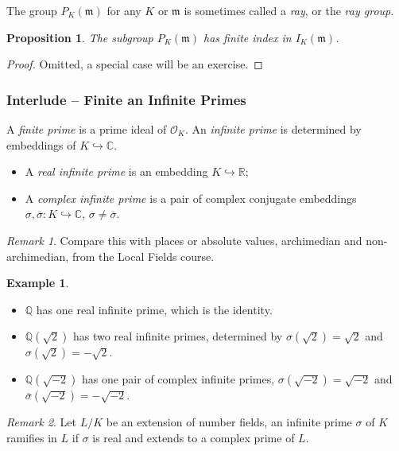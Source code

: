 \documentclass[11pt]{article}
\theoremstyle{definition}
\newtheorem*{example*}{Example}
\theoremstyle{plain}
\newtheorem{proposition}[definition]{Proposition}
\theoremstyle{remark}
\newtheorem*{remark*}{Remark}
\newcommand{\QQ}{\mathbb{Q}}
\newcommand{\RR}{\mathbb{R}}
\newcommand{\CC}{\mathbb{C}}
\newcommand{\cO}{\mathcal{O}}
\newcommand{\fm}{\mathfrak{m}}
\begin{document}
The group $P_K(\fm)$ for any $K$ or $\fm$ is sometimes called a \emph{ray}, or the \emph{ray group}.

\begin{proposition}\label{prop:2_16}
    The subgroup $P_K(\fm)$ has finite index in $I_K(\fm)$.
\end{proposition}
\begin{proof}
    Omitted, a special case will be an exercise.
\end{proof}

\subsubsection*{Interlude -- Finite an Infinite Primes}
A \emph{finite prime} is a prime ideal of $\cO_K$. An \emph{infinite prime} is determined by embeddings of $K \hookrightarrow \CC$.
\begin{itemize}
    \item A \emph{real infinite prime} is an embedding $K \hookrightarrow \RR$;
    \item A \emph{complex infinite prime} is a pair of complex conjugate embeddings $\sigma, \overline{\sigma} : K \hookrightarrow \CC$, $\sigma \neq \overline{\sigma}$.
\end{itemize}

\begin{remark*}
    Compare this with places or absolute values, archimedian and non-archimedian, from the Local Fields course.
\end{remark*}

\begin{example*}\phantom{}
    \begin{itemize}
        \item $\QQ$ has one real infinite prime, which is the identity.
        \item $\QQ(\sqrt{2})$ has two real infinite primes, determined by $\sigma(\sqrt{2}) = \sqrt{2}$ and $\sigma(\sqrt{2}) = -\sqrt{2}$.
        \item $\QQ(\sqrt{-2})$ has one pair of complex infinite primes, $\sigma(\sqrt{-2}) = \sqrt{-2}$ and $\overline{\sigma}(\sqrt{-2}) = -\sqrt{-2}$.
    \end{itemize}
\end{example*}

\begin{remark*}
    Let $L/K$ be an extension of number fields, an infinite prime $\sigma$ of $K$ ramifies in $L$ if $\sigma$ is real and extends to a complex prime of $L$.
\end{remark*}
\end{document}

